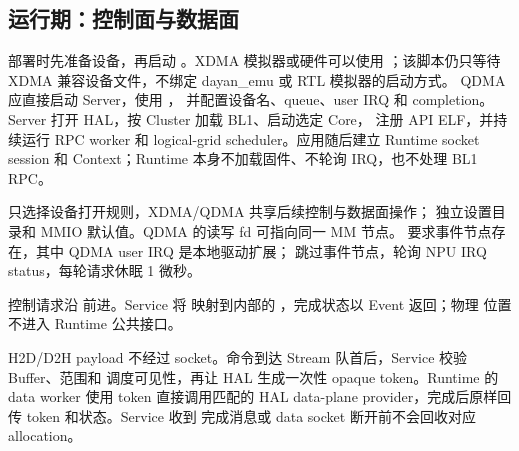 \documentclass[../dayan_kernel_manual.tex]{subfiles}
\begin{document}
\subsection{运行期：控制面与数据面}

部署时先准备设备，再启动 。XDMA 模拟器或硬件可以使用
；该脚本仍只等待 XDMA 兼容设备文件，不绑定 dayan_emu 或 RTL 模拟器的启动方式。
QDMA 应直接启动 Server，使用 ，
并配置设备名、queue、user IRQ 和 completion。Server 打开 HAL，按 Cluster 加载 BL1、启动选定 Core，
注册 API ELF，并持续运行 RPC worker 和 logical-grid scheduler。应用随后建立 Runtime
socket session 和 Context；Runtime 本身不加载固件、不轮询 IRQ，也不处理 BL1 RPC。

 只选择设备打开规则，XDMA/QDMA 共享后续控制与数据面操作；
 独立设置目录和 MMIO 默认值。QDMA 的读写 fd 可指向同一 MM 节点。
 要求事件节点存在，其中 QDMA user IRQ 是本地驱动扩展；
 跳过事件节点，轮询 NPU IRQ status，每轮请求休眠 1 微秒。

控制请求沿
 前进。Service 将
 映射到内部的 ，完成状态以 Event 返回；物理
位置不进入 Runtime 公共接口。

H2D/D2H payload 不经过 socket。命令到达 Stream 队首后，Service 校验 Buffer、范围和
调度可见性，再让 HAL 生成一次性 opaque token。Runtime 的 data worker 使用 token
直接调用匹配的 HAL data-plane provider，完成后原样回传 token 和状态。Service 收到
完成消息或 data socket 断开前不会回收对应 allocation。
\end{document}
